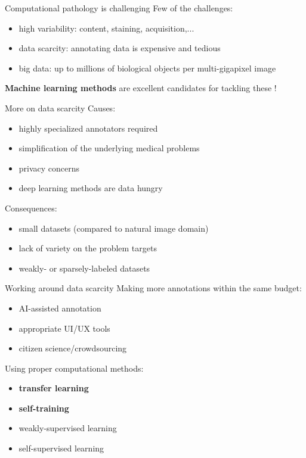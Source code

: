 \documentclass{beamer}
\begin{document}
\begin{frame}{Computational pathology is challenging}
	Few of the challenges:
	\begin{itemize}
		\item {high variability}: content, staining, acquisition,...
		\item {data scarcity}: annotating data is expensive and tedious
		\item {big data}: up to millions of biological objects per multi-gigapixel image
	\end{itemize}
	\vfill
	\begin{center}
		\large
		\textbf{Machine learning methods} are excellent candidates for tackling these !
	\end{center}
\end{frame}

\begin{frame}{More on data scarcity}
Causes:
\begin{itemize}
	\item highly specialized annotators required
	\item simplification of the underlying medical problems
	\item privacy concerns
	\item deep learning methods are data hungry 
\end{itemize}

Consequences:
\begin{itemize}
	\item small datasets (compared to natural image domain)
	\item lack of variety on the problem targets 
	\item weakly- or sparsely-labeled datasets 
\end{itemize}
\end{frame}

\begin{frame}{Working around data scarcity}
Making more annotations within the same budget:
\begin{itemize}
	\item AI-assisted annotation
	\item appropriate UI/UX tools 
	\item citizen science/crowdsourcing
\end{itemize}

Using proper computational methods:
\begin{itemize}
	\item \textbf{transfer learning}
	\item \textbf{self-training}
	\item weakly-supervised learning
	\item self-supervised learning
\end{itemize}
\end{frame}
\end{document}
